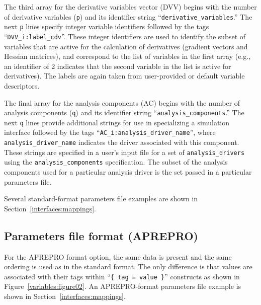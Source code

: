 The third array for the derivative variables vector (DVV) begins with
the number of derivative variables (\texttt{p}) and its identifier
string ``\texttt{derivative\_variables}.'' The next \texttt{p} lines
specify integer variable identifiers followed by the tags
``\texttt{DVV\_i:label\_cdv}''.  These integer identifiers are used to
identify the subset of variables that are active for the calculation
of derivatives (gradient vectors and Hessian matrices), and correspond
to the list of variables in the first array (e.g., an identifier of 2
indicates that the second variable in the list is active for
derivatives).  The labels are again taken from user-provided or
default variable descriptors.

The final array for the analysis components (AC) begins with the
number of analysis components (\texttt{q}) and its identifier string
``\texttt{analysis\_components}.'' The next \texttt{q} lines provide
additional strings for use in specializing a simulation interface
followed by the tags ``\texttt{AC\_i:analysis\_driver\_name}'', where
\texttt{analysis\_driver\_name} indicates the driver associated with
this component.  These strings are specified in a user's input file
for a set of \texttt{analysis\_drivers} using the
\texttt{analysis\_components} specification.  The subset of the
analysis components used for a particular analysis driver is the set
passed in a particular parameters file.

Several standard-format parameters file examples are shown in
Section~\ref{interfaces:mappings}.

\subsection{Parameters file format (APREPRO)}\label{variables:parameters:aprepro}

For the APREPRO format option, the same data is present and the same
ordering is used as in the standard format. The only difference is
that values are associated with their tags within ``\texttt{\{ tag =
value \}}'' constructs as shown in Figure~\ref{variables:figure02}.
An APREPRO-format parameters file example is shown in
Section~\ref{interfaces:mappings}.


